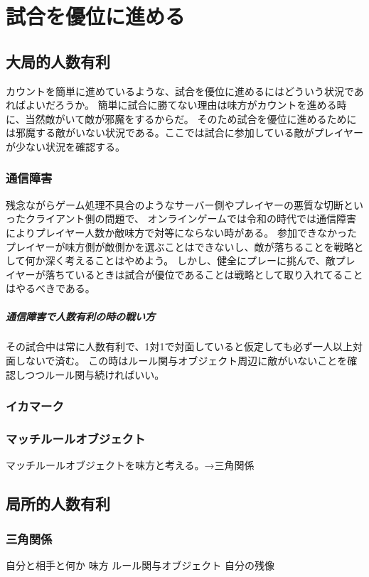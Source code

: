\documentclass[a4paper,11pt]{jsbook}
\begin{document}
\chapter{試合を優位に進める}
\section{大局的人数有利}
カウントを簡単に進めているような、試合を優位に進めるにはどういう状況であればよいだろうか。
簡単に試合に勝てない理由は味方がカウントを進める時に、当然敵がいて敵が邪魔をするからだ。
そのため試合を優位に進めるためには邪魔する敵がいない状況である。ここでは試合に参加している敵がプレイヤーが少ない状況を確認する。

\subsection{通信障害}
残念ながらゲーム処理不具合のようなサーバー側やプレイヤーの悪質な切断といったクライアント側の問題で、
オンラインゲームでは令和の時代では通信障害によりプレイヤー人数か敵味方で対等にならない時がある。
参加できなかったプレイヤーが味方側が敵側かを選ぶことはできないし、敵が落ちることを戦略として何か深く考えることはやめよう。
しかし、健全にプレーに挑んで、敵プレイヤーが落ちているときは試合が優位であることは戦略として取り入れてることはやるべきである。
\paragraph{通信障害で人数有利の時の戦い方}
その試合中は常に人数有利で、1対1で対面していると仮定しても必ず一人以上対面しないで済む。
この時はルール関与オブジェクト周辺に敵がいないことを確認しつつルール関与続ければいい。



\subsection{イカマーク}
\subsection{マッチルールオブジェクト}
マッチルールオブジェクトを味方と考える。→三角関係

\section{局所的人数有利}
\subsection{三角関係}
自分と相手と何か
味方
ルール関与オブジェクト
自分の残像
\end{document}

